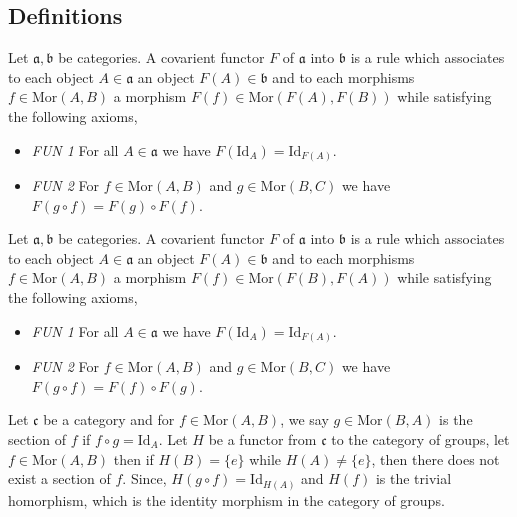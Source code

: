 \documentclass[11pt,a4paper]{colorart}
\def\mab{\mathfrak}
\def\oo{\circ}
\begin{document}
\subsection{Definitions}

\begin{definition}
	Let $\mab{a}, \mab{b}$ be categories. A covarient functor $F$ of $\mab{a}$ into $\mab{b}$ is a rule which associates to each object $A \in \mab{a}$ an object $F(A) \in \mab{b}$ and to each morphisms $f \in \text{Mor}(A,B)$ a morphism $F(f) \in \text{Mor}(F(A),F(B))$ while satisfying the following axioms,
	\begin{itemize}
		\item \textit{FUN 1} For all $A \in \mab{a}$ we have $F(\text{Id}_A) = \text{Id}_{F(A)}$.
		\item \textit{FUN 2} For $f \in \text{Mor}(A,B)$ and $g \in \text{Mor}(B,C)$ we have $F(g \oo f) = F(g) \oo F(f)$.
	\end{itemize}
\end{definition}

\newpage

\begin{definition}
	Let $\mab{a}, \mab{b}$ be categories. A covarient functor $F$ of $\mab{a}$ into $\mab{b}$ is a rule which associates to each object $A \in \mab{a}$ an object $F(A) \in \mab{b}$ and to each morphisms $f \in \text{Mor}(A,B)$ a morphism $F(f) \in \text{Mor}(F(B),F(A))$ while satisfying the following axioms,
	\begin{itemize}
		\item \textit{FUN 1} For all $A \in \mab{a}$ we have $F(\text{Id}_A) = \text{Id}_{F(A)}$.
		\item \textit{FUN 2} For $f \in \text{Mor}(A,B)$ and $g \in \text{Mor}(B,C)$ we have $F(g \oo f) = F(f) \oo F(g)$.
	\end{itemize}
\end{definition}

\begin{example}[]
	Let $\mab{c}$ be a category and for $f \in \text{Mor}(A,B)$, we say $g \in \text{Mor}(B,A)$ is the section of $f$ if $f \oo g = \text{Id}_A$. Let $H$ be a functor from $\mab{c}$ to the category of groups, let $f \in \text{Mor}(A,B)$ then if $H(B) = \{e\}$ while $H(A) \neq \{e\}$, then there does not exist a section of $f$. Since, $H(g \oo f) = \text{Id}_{H(A)}$ and $H(f)$ is the trivial homorphism, which is the identity morphism in the category of groups.
\end{example}
\end{document}
